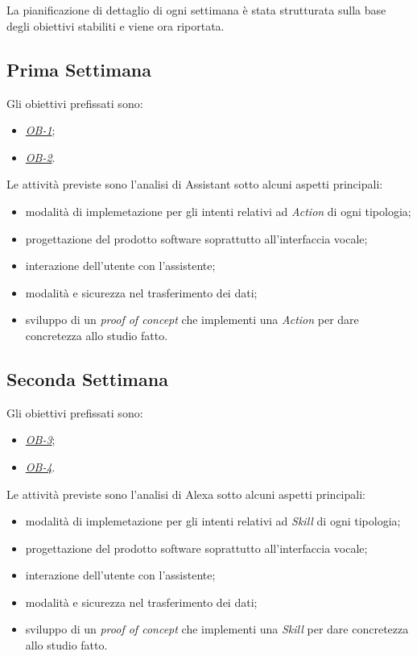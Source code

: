 \\ \\
La pianificazione di dettaglio di ogni settimana è stata strutturata sulla base degli obiettivi stabiliti e viene ora riportata.
	\subsection*{Prima Settimana}
	Gli obiettivi prefissati sono:
	\begin{itemize}
		\item \textit{\underline{OB-1}};
		\item \textit{\underline{OB-2}}.
	\end{itemize}
	Le attività previste sono l'analisi di Assistant sotto alcuni aspetti principali:
	\begin{itemize}
		\item modalità di implemetazione per gli intenti relativi ad \textit{Action} di ogni tipologia;
		\item progettazione del prodotto software soprattutto all'interfaccia vocale;
		\item interazione dell'utente con l'assistente;
		\item modalità e sicurezza nel trasferimento dei dati;
		\item sviluppo di un \textit{proof of concept} che implementi una \textit{Action} per dare concretezza allo studio fatto.
	\end{itemize}
	\subsection*{Seconda Settimana}
	Gli obiettivi prefissati sono:
	\begin{itemize}
		\item \textit{\underline{OB-3}};
		\item \textit{\underline{OB-4}}.
	\end{itemize}
	Le attività previste sono l'analisi di Alexa sotto alcuni aspetti principali:
	\begin{itemize}
		\item modalità di implemetazione per gli intenti relativi ad \textit{Skill} di ogni tipologia;
		\item progettazione del prodotto software soprattutto all'interfaccia vocale;
		\item interazione dell'utente con l'assistente;
		\item modalità e sicurezza nel trasferimento dei dati;
		\item sviluppo di un \textit{proof of concept} che implementi una \textit{Skill} per dare concretezza allo studio fatto.
	\end{itemize}
